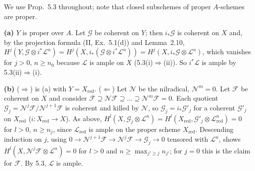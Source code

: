 \documentclass[11pt]{article}
\begin{document}
\pf
We use Prop.~5.3 throughout; note that closed subschemes of proper $A$-schemes are proper.

\textbf{(a)} $Y$ is proper over $A$. Let $\mathcal G$ be coherent on $Y$; then $i_*\mathcal G$ is coherent on $X$ and, by the projection formula (II, Ex.~5.1(d)) and Lemma~2.10, $H^j(Y,\mathcal G\otimes i^*\mathcal L^n)=H^j(X,i_*(\mathcal G\otimes i^*\mathcal L^n))=H^j(X,i_*\mathcal G\otimes\mathcal L^n)$, which vanishes for $j>0$, $n\ge n_0$ because $\mathcal L$ is ample on $X$ (5.3(i)$\Rightarrow$(ii)). So $i^*\mathcal L$ is ample by 5.3(ii)$\Rightarrow$(i).

\textbf{(b)} ($\Rightarrow$) is (a) with $Y=X_{\mathrm{red}}$. ($\Leftarrow$) Let $\mathcal N$ be the nilradical, $\mathcal N^m=0$. Let $\mathcal F$ be coherent on $X$ and consider $\mathcal F\supseteq\mathcal N\mathcal F\supseteq\dots\supseteq\mathcal N^m\mathcal F=0$. Each quotient $\mathcal G_j=\mathcal N^j\mathcal F/\mathcal N^{j+1}\mathcal F$ is coherent and killed by $\mathcal N$, so $\mathcal G_j=i_*\mathcal G'_j$ for a coherent $\mathcal G'_j$ on $X_{\mathrm{red}}$ ($i\colon X_{\mathrm{red}}\to X$). As above, $H^l(X,\mathcal G_j\otimes\mathcal L^n)=H^l(X_{\mathrm{red}},\mathcal G'_j\otimes\mathcal L_{\mathrm{red}}^n)=0$ for $l>0$, $n\ge n_j$, since $\mathcal L_{\mathrm{red}}$ is ample on the proper scheme $X_{\mathrm{red}}$. Descending induction on $j$, using $0\to\mathcal N^{j+1}\mathcal F\to\mathcal N^j\mathcal F\to\mathcal G_j\to0$ tensored with $\mathcal L^n$, shows $H^l(X,\mathcal N^j\mathcal F\otimes\mathcal L^n)=0$ for $l>0$ and $n\ge\max_{j'\ge j}n_{j'}$; for $j=0$ this is the claim for $\mathcal F$. By 5.3, $\mathcal L$ is ample.
\end{document}
